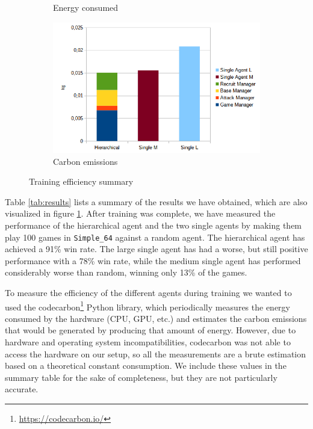 \begin{figure}[t]
\begin{subfigure}[b]{0.495\textwidth}
        \caption{Energy consumed}
    \end{subfigure}
    \begin{subfigure}[b]{0.495\textwidth}
        \includegraphics[width=1\textwidth]{figs/training_emissions.png}
        \caption{Carbon emissions}
    \end{subfigure}
    \caption{Training efficiency summary}
    \label{fig:results}
\end{figure}

Table \ref{tab:results} lists a summary of the results we have obtained, which are also visualized in figure \ref{fig:results}. After training was complete, we have measured the performance of the hierarchical agent and the two single agents by making them play 100 games in \texttt{Simple\_64} against a random agent. The hierarchical agent has achieved a 91\% win rate. The large single agent has had a worse, but still positive performance with a 78\% win rate, while the medium single agent has performed considerably worse than random, winning only 13\% of the games.

To measure the efficiency of the different agents during training we wanted to used the codecarbon\footnote{\url{https://codecarbon.io/}} Python library, which periodically measures the energy consumed by the hardware (CPU, GPU, etc.) and estimates the carbon emissions that would be generated by producing that amount of energy. However, due to hardware and operating system incompatibilities, codecarbon was not able to access the hardware on our setup, so all the measurements are a brute estimation based on a theoretical constant consumption. We include these values in the summary table for the sake of completeness, but they are not particularly accurate.

